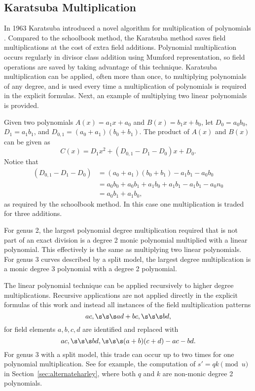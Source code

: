 \subsection{Karatsuba Multiplication} 
\label{sec:karatsubamul}
In 1963 Karatsuba introduced a novel algorithm for multiplication of polynomials
\cite{KaratsubaOfman_polymul_1963}. Compared to the schoolbook method, the
Karatsuba method saves field multiplications at the cost of extra field
additions. Polynomial multiplication occurs regularly in divisor
class addition using Mumford representation, so field operations are saved by
taking advantage of this technique. Karatsuba multiplication can be applied,
often more than once, to multiplying polynomials of any degree, and is used
every time a multiplication of polynomials is required in the explicit
formulas. Next, an example of multiplying two linear polynomials is provided.

Given two polynomials $A(x) = a_1x + a_0$ and $B(x) = b_1x + b_0$, let $D_0 =
a_0b_0$, $D_1 = a_1b_1$, and $D_{0,1} = (a_0 + a_1)(b_0 + b_1)$. The product of
$A(x)$ and $B(x)$ can be given as  $$C(x) = D_1x^2 + (D_{0,1} - D_1 - D_0)x +
D_0.$$ Notice that 
\begin{align*} (D_{0,1} - D_1 - D_0) &= (a_0 +
a_1)(b_0 + b_1) - a_1b_1 - a_0b_0\\
                      &= a_0b_0 + a_0b_1 + a_1b_0 + a_1b_1 - a_1b_1 - a_0n_0\\
                      &= a_0b_1 + a_1b_0,
\end{align*} 
as required by the schoolbook method. In this case one multiplication is traded
for three additions.

For genus 2, the largest polynomial degree multiplication required that is not
part of an exact division  is a degree 2 monic polynomial multiplied with a
linear polynomial. This effectively is the same as multiplying two linear
polynomials. For genus 3 curves described by a split model, the largest degree
multiplication is a monic degree 3 polynomial with a degree 2 polynomial. 

The linear polynomial technique can be applied recursively to higher degree
multiplications. Recursive applications are not applied directly in the explicit
formulas of this work and instead all instances of the field multiplication
patterns $$ac, \s\s\s ad + bc, \s\s\s bd,$$ for field elements $a,b,c,d$ are
identified and replaced with $$ ac, \s\s\s bd, \s\s\s (a + b)(c + d) - ac -
bd.$$ For genus 3 with a split model, this trade can occur up to two times for
one polynomial multiplication. See for example, the computation of $s' = qk
\pmod{u}$ in Section~\ref{sec:alternateharley}, where both $q$ and $k$ are
non-monic degree 2 polynomials.


